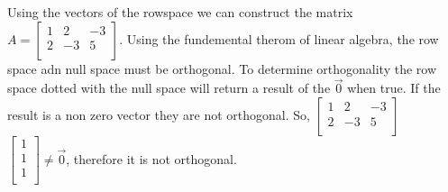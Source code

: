 				Using the vectors of the rowspace we can construct the matrix $A= \begin{bmatrix}
			    1 & 2 & -3 \\
			    2 & -3 & 5 \\
				\end{bmatrix}$.
				Using the fundemental therom of linear algebra, the row space adn null space must be orthogonal.  To determine orthogonality the row space dotted with the null space will return a result of the $\vec{0}$ when true.  If the result is a non zero vector they are not orthogonal. So, 
				\newline
				$\begin{bmatrix}
			    1 & 2 & -3 \\
			    2 & -3 & 5 \\
				\end{bmatrix}$
				$\begin{bmatrix}
			    1 \\
			    1 \\
			    1 \\
				\end{bmatrix} \neq \vec{0}$, therefore it is not orthogonal.
